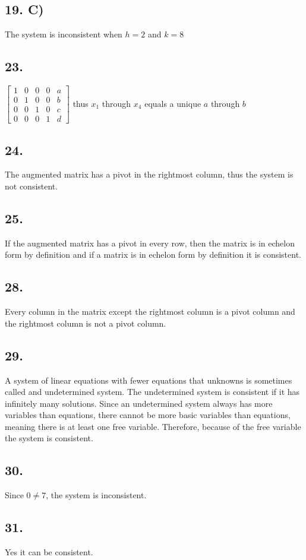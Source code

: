 \documentclass[12]{scrartcl}
\begin{document}
\subsection*{19. C)}
The system is inconsistent when $h = 2 $ and $k = 8$
\subsection*{23.}
$ \begin{bmatrix} 1 &0 & 0&0&a \\ 0 &1 & 0&0&b \\ 0 &0 & 1&0&c \\ 0 &0 & 0&1&d \end{bmatrix} $
thus $x_1$ through $x_4$ equals a unique $a$ through $b$
\subsection*{24.}
The augmented matrix has a pivot in the rightmost column, thus the system is not consistent. 
\subsection*{25.}
If the augmented matrix has a pivot in every row, then the matrix is in echelon form by definition and if a matrix is in echelon form by definition it is consistent. 
\subsection*{28.}
Every column in the matrix except the rightmost column is a pivot column and the rightmost column is not a pivot column. 
\subsection*{29.}
A system of linear equations with fewer equations that unknowns is sometimes called and undetermined system. 
The undetermined system is consistent if it has infinitely many solutions. Since an undetermined system always has more variables than equations, there cannot be more basic variables than equations, meaning there is at least one free variable. Therefore, because of the free variable the system is consistent. 
\subsection*{30.}
Since $0 \neq 7$, the system is inconsistent. 
\subsection*{31.}
Yes it can be consistent. 
\end{document}
